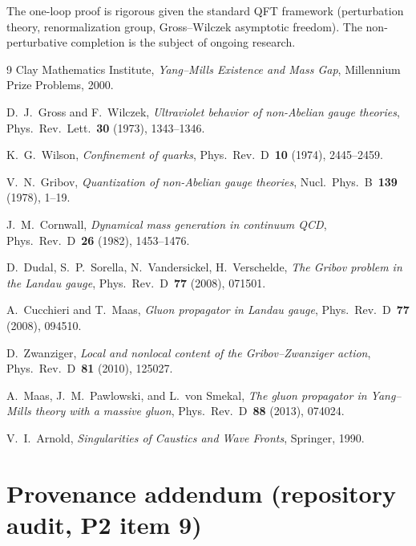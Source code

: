\documentclass[11pt]{article}
\theoremstyle{definition}
\theoremstyle{remark}
\begin{document}
The one-loop proof is rigorous given the standard QFT framework
(perturbation theory, renormalization group, Gross--Wilczek
asymptotic freedom). The non-perturbative completion is the subject
of ongoing research.

\begin{thebibliography}{9}
  Clay Mathematics Institute, {\em Yang--Mills Existence and Mass
  Gap}, Millennium Prize Problems, 2000.

  D.~J.~Gross and F.~Wilczek, {\em Ultraviolet behavior of
  non-Abelian gauge theories}, Phys.~Rev.~Lett.~\textbf{30} (1973),
  1343--1346.

  K.~G.~Wilson, {\em Confinement of quarks}, Phys.~Rev.~D~\textbf{10}
  (1974), 2445--2459.

  V.~N.~Gribov, {\em Quantization of non-Abelian gauge theories},
  Nucl.~Phys.~B~\textbf{139} (1978), 1--19.

  J.~M.~Cornwall, {\em Dynamical mass generation in continuum QCD},
  Phys.~Rev.~D~\textbf{26} (1982), 1453--1476.

  D.~Dudal, S.~P.~Sorella, N.~Vandersickel, H.~Verschelde,
  {\em The Gribov problem in the Landau gauge}, Phys.~Rev.~D~\textbf{77}
  (2008), 071501.

  A.~Cucchieri and T.~Maas, {\em Gluon propagator in Landau gauge},
  Phys.~Rev.~D~\textbf{77} (2008), 094510.

  D.~Zwanziger, {\em Local and nonlocal content of the
  Gribov--Zwanziger action}, Phys.~Rev.~D~\textbf{81} (2010),
  125027.

  A.~Maas, J.~M.~Pawlowski, and L.~von Smekal, {\em The gluon
  propagator in Yang--Mills theory with a massive gluon}, Phys.~Rev.~D~\textbf{88}
  (2013), 074024.

  V.~I.~Arnold, {\em Singularities of Caustics and Wave Fronts},
  Springer, 1990.
\end{thebibliography}

\section*{Provenance addendum (repository audit, P2 item 9)}
\end{document}
